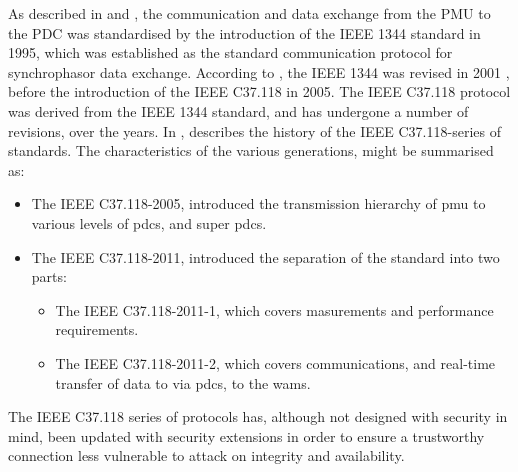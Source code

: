 As described in \cite{martin2014overview} and \cite{ali2016performance}, the communication and data exchange from the PMU to the PDC was standardised by the introduction of the IEEE 1344 standard in 1995, which was established as the standard communication protocol for synchrophasor data exchange. According to \cite{appasani2018review}, the IEEE 1344 was revised in 2001 , before the introduction of the IEEE C37.118 in 2005. The  IEEE C37.118 protocol was derived from the IEEE 1344 standard, and has undergone a number of revisions, over the years.
In \cite{martin2014overview}, \citeauthor{martin2014overview} describes the history of the 
IEEE C37.118-series of standards. The characteristics of the various generations, might be summarised as:
\begin{itemize}
 
    \item The IEEE C37.118-2005, introduced the transmission hierarchy of  \acrshort{pmu} to various levels of \acrshort{pdc}s, and super \acrshort{pdc}s.
    \item The IEEE C37.118-2011, introduced the separation of the standard into two parts:
    \begin{itemize}
    \item The IEEE C37.118-2011-1, which covers masurements and performance requirements.
    \item The IEEE C37.118-2011-2, which covers communications, and real-time transfer of data to via \acrshort{pdc}s, to the \acrshort{wams}.  
    \end{itemize}
\end{itemize}

The IEEE C37.118 series of protocols has, although not designed with security in mind, been updated with security extensions in order to ensure a trustworthy connection less vulnerable to attack on integrity and availability. 

  